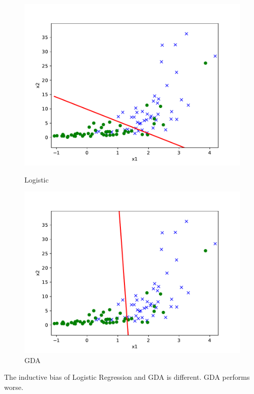 \begin{answer}
	\begin{figure}[H]
		\centering
		\begin{minipage}[b]{0.46\linewidth}
			\centering
			\includegraphics[width=\linewidth]{ds1.pdf}
			\caption{Logistic}%
		\end{minipage}
		\begin{minipage}[b]{0.46\linewidth}
			\centering
			\includegraphics[width=\linewidth]{ds1_gda.pdf}
			\caption{GDA}%
		\end{minipage}
	\end{figure}
	The inductive bias of Logistic Regression and GDA is different. GDA performs worse.
\end{answer}

